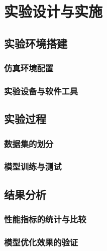 \chapter{实验设计与实施}

\section{实验环境搭建}


\subsection{仿真环境配置}

\subsection{实验设备与软件工具}




\section{实验过程}



\subsection{数据集的划分}

\subsection{模型训练与测试}




\section{结果分析}

\subsection{性能指标的统计与比较}

\subsection{模型优化效果的验证}